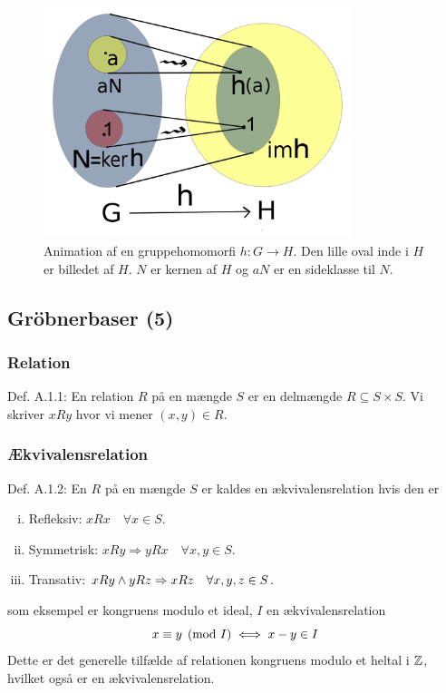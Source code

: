 \begin{figure}
\begin{center}
  \includegraphics[width=0.8\textwidth]{img/group_homomorphism}
  \caption[labelInTOC]{
  Animation af en gruppehomomorfi $h: G \rightarrow H$. Den lille oval inde i
  $H$ er billedet af $H$. $N$ er kernen af $H$ og $aN$ er en sideklasse til
  $N$.}
  \label{figureLabel}
\end{center}
\end{figure}

\subsection{Gröbnerbaser (5)}
\label{Gröbnerbaser (5)}
\subsubsection{Relation}
\label{Relation}
Def. A.1.1: En relation $R$ på en mængde $S$ er en delmængde $R \subseteq S
\times S$. Vi skriver $xRy$ hvor vi mener $(x,y) \in R$.

\subsubsection{Ækvivalensrelation}
\label{Aekvivalensrelation}
Def. A.1.2: En  $R$ på en mængde $S$ er kaldes en
ækvivalensrelation hvis den er
\begin{enumerate}[(i)]
  \item Refleksiv: $xRx \quad \forall x \in S$.
  \item Symmetrisk: $xRy \Rightarrow yRx \quad \forall x,y \in S$.
  \item Transativ: $xRy \wedge yRz \Rightarrow xRz \quad \forall x,y,z \in S$.
\end{enumerate}
som eksempel er kongruens modulo et ideal, $I$ en ækvivalensrelation
\begin{equation*}
  x \equiv y \pmod{I} \iff x - y \in I
\end{equation*}
Dette er det generelle tilfælde af relationen kongruens modulo et heltal i
$\mathbb{Z}$, hvilket også er en ækvivalensrelation.

